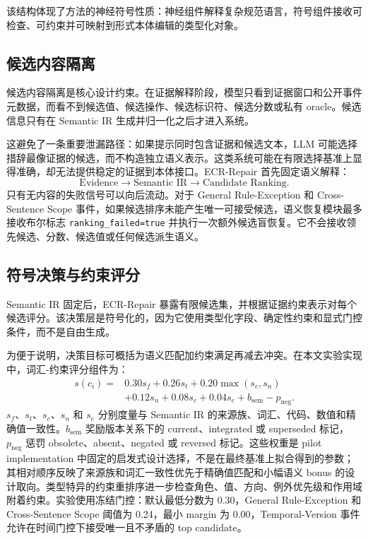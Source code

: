 \documentclass[conference]{IEEEtran}
\begin{document}
该结构体现了方法的神经符号性质：神经组件解释复杂规范语言，符号组件接收可检查、可约束并可映射到形式本体编辑的类型化对象。

\subsection{候选内容隔离}

候选内容隔离是核心设计约束。在证据解释阶段，模型只看到证据窗口和公开事件元数据，而看不到候选值、候选操作、候选标识符、候选分数或私有 oracle。候选信息只有在 Semantic IR 生成并归一化之后才进入系统。

这避免了一条重要泄漏路径：如果提示同时包含证据和候选文本，LLM 可能选择措辞最像证据的候选，而不构造独立语义表示。这类系统可能在有限选择基准上显得准确，却无法提供稳定的证据到本体接口。ECR-Repair 首先固定语义解释：
\[
\text{Evidence}
\rightarrow
\text{Semantic IR}
\rightarrow
\text{Candidate Ranking}.
\]
只有无内容的失败信号可以向后流动。对于 General Rule-Exception 和 Cross-Sentence Scope 事件，如果候选排序未能产生唯一可接受候选，语义恢复模块最多接收布尔标志 \texttt{ranking\_failed=true} 并执行一次额外候选盲恢复。它不会接收领先候选、分数、候选值或任何候选派生语义。

\subsection{符号决策与约束评分}

Semantic IR 固定后，ECR-Repair 暴露有限候选集，并根据证据约束表示对每个候选评分。该决策层是符号化的，因为它使用类型化字段、确定性约束和显式门控条件，而不是自由生成。

为便于说明，决策目标可概括为语义匹配加约束满足再减去冲突。在本文实验实现中，词汇-约束评分组件为：
\[
\begin{aligned}
s(c_i)=&0.30s_f+0.26s_t+0.20\max(s_c,s_n)\\
&+0.12s_n+0.08s_c+0.04s_e+b_{\mathrm{sem}}-p_{\mathrm{neg}} .
\end{aligned}
\]
$s_f$、$s_t$、$s_c$、$s_n$ 和 $s_e$ 分别度量与 Semantic IR 的来源族、词汇、代码、数值和精确值一致性。$b_{\mathrm{sem}}$ 奖励版本关系下的 current、integrated 或 superseded 标记，$p_{\mathrm{neg}}$ 惩罚 obsolete、absent、negated 或 reversed 标记。这些权重是 pilot implementation 中固定的启发式设计选择，不是在最终基准上拟合得到的参数；其相对顺序反映了来源族和词汇一致性优先于精确值匹配和小幅语义 bonus 的设计取向。类型特异的约束重排序进一步检查角色、值、方向、例外优先级和作用域附着约束。实验使用冻结门控：默认最低分数为 0.30，General Rule-Exception 和 Cross-Sentence Scope 阈值为 0.24，最小 margin 为 0.00，Temporal-Version 事件允许在时间门控下接受唯一且不矛盾的 top candidate。
\end{document}
